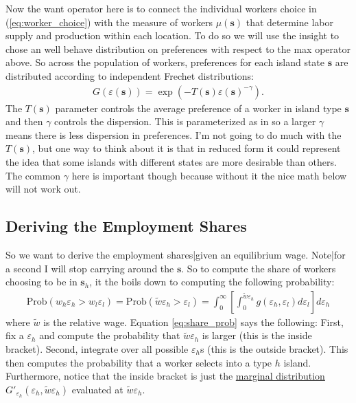 \documentclass[pdftex,12pt]{article}
\begin{document}
\medskip
\noindent Now the want operator here is to connect the individual workers choice in (\ref{eq:worker_choice}) with the measure of workers $\mu(\textbf{s})$ that determine labor supply and production within each location. To do so we will use the \citet{eaton2002technology} insight to chose an well behave distribution on preferences with respect to the max operator above. So across the population of workers, preferences for each island state $\textbf{s}$ are distributed according to independent Frechet distributions:
\begin{align}
G(\varepsilon(\textbf{s})) = \exp\left(-T(\textbf{s})\varepsilon(\textbf{s})^{-\gamma}\right).
\end{align}
The $T(\textbf{s})$ parameter controls the average preference of a worker in island type $\textbf{s}$ and then $\gamma$ controls the dispersion. This is parameterized as in \citet{eaton2002technology} so a larger $\gamma$ means there is less dispersion in preferences. I'm not going to do much with the $T(\textbf{s})$, but one way to think about it is that in reduced form it could represent the idea that some islands with different states are more desirable than others. The common $\gamma$ here is important though because without it the nice math below will not work out.

\subsection{Deriving the Employment Shares}

So we want to derive the employment shares|given an equilibrium wage. Note|for a second I will stop carrying around the $\textbf{s}$. So to compute the share of workers choosing to be in $\textbf{s}_h$, it the boils down to computing the following probability:
\begin{align}
\mathrm{Prob}\left(w_h \varepsilon_h >  w_l\varepsilon_l\right) = \mathrm{Prob}\left(\tilde w \varepsilon_h > \varepsilon_l\right) = \int_0^{\infty}\left[\int_0^{\tilde w\varepsilon_h}g(\varepsilon_h,\varepsilon_l)d\varepsilon_l\right]d\varepsilon_h \label{eq:share_prob}
\end{align}
where $\tilde w$ is the relative wage. Equation \ref{eq:share_prob} says the following: First, fix a $\varepsilon_h$ and compute the probability that $\tilde w \varepsilon_h$ is larger (this is the inside bracket). Second,  integrate over all possible $\varepsilon_h$s (this is the outside bracket). This then computes the probability that a worker selects into a type $h$ island. Furthermore, notice that the inside bracket is just the \href{https://en.wikipedia.org/wiki/Marginal_distribution}{marginal distribution} $G'_{\varepsilon_h}(\varepsilon_h,\tilde w\varepsilon_h)$ evaluated at $\tilde w\varepsilon_h$.
\end{document}
